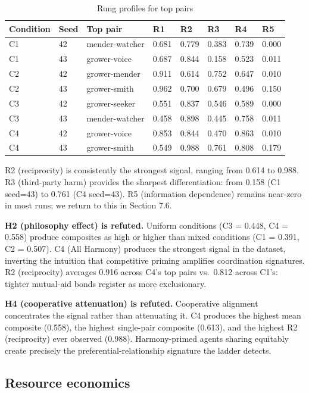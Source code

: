 \documentclass[10pt,a4paper]{article}
\begin{document}
\begin{table}[H]
\centering\small
\caption{Rung profiles for top pairs}
\begin{tabular}{llllllll}
\hline
Condition & Seed & Top pair & R1 & R2 & R3 & R4 & R5 \\
\hline
C1 & 42 & mender-watcher & 0.681 & 0.779 & 0.383 & 0.739 & 0.000 \\
C1 & 43 & grower-voice & 0.687 & 0.844 & 0.158 & 0.523 & 0.011 \\
C2 & 42 & grower-mender & 0.911 & 0.614 & 0.752 & 0.647 & 0.010 \\
C2 & 43 & grower-smith & 0.962 & 0.700 & 0.679 & 0.496 & 0.150 \\
C3 & 42 & grower-seeker & 0.551 & 0.837 & 0.546 & 0.589 & 0.000 \\
C3 & 43 & mender-watcher & 0.458 & 0.898 & 0.445 & 0.758 & 0.011 \\
C4 & 42 & grower-voice & 0.853 & 0.844 & 0.470 & 0.863 & 0.010 \\
C4 & 43 & grower-smith & 0.549 & 0.988 & 0.761 & 0.808 & 0.179 \\
\hline
\end{tabular}
\end{table}

R2 (reciprocity) is consistently the strongest signal, ranging from 0.614 to 0.988. R3 (third-party harm) provides the sharpest differentiation: from 0.158 (C1 seed=43) to 0.761 (C4 seed=43). R5 (information dependence) remains near-zero in most runs; we return to this in Section 7.6.

\textbf{H2 (philosophy effect) is refuted.} Uniform conditions (C3 = 0.448, C4 = 0.558) produce composites as high or higher than mixed conditions (C1 = 0.391, C2 = 0.507). C4 (All Harmony) produces the strongest signal in the dataset, inverting the intuition that competitive priming amplifies coordination signatures. R2 (reciprocity) averages 0.916 across C4's top pairs vs.\ 0.812 across C1's: tighter mutual-aid bonds register as more exclusionary.

\textbf{H4 (cooperative attenuation) is refuted.} Cooperative alignment concentrates the signal rather than attenuating it. C4 produces the highest mean composite (0.558), the highest single-pair composite (0.613), and the highest R2 (reciprocity) ever observed (0.988). Harmony-primed agents sharing equitably create precisely the preferential-relationship signature the ladder detects.

\subsection{Resource economics}
\end{document}
